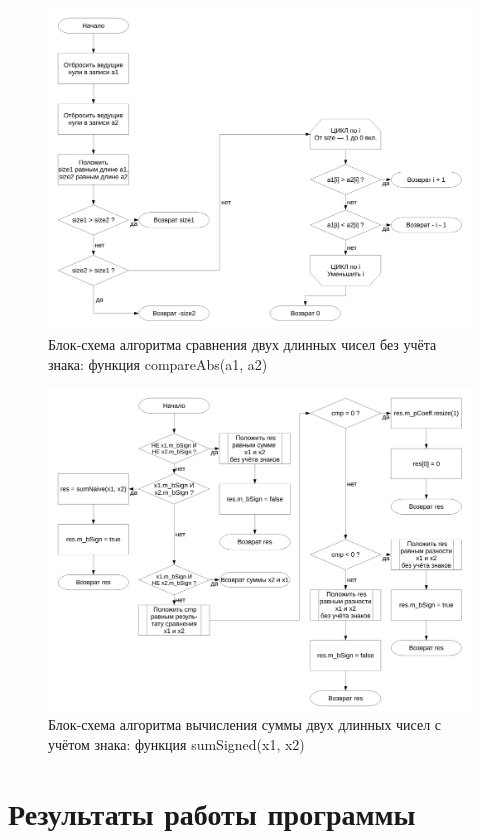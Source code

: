 \documentclass[a4paper,12pt]{article} %
\begin{document}
\begin{figure}[ht]
	\includegraphics[width=\textwidth]{lr1_compareAbs.pdf}
	\caption{Блок-схема алгоритма сравнения двух длинных чисел без учёта знака: функция compareAbs(a1, a2)}
\end{figure}

\begin{figure}[ht]
	\includegraphics[width=\textwidth]{lr1_sumSigned.pdf}
	\caption{Блок-схема алгоритма вычисления суммы двух длинных чисел с учётом знака: функция sumSigned(x1, x2)}
\end{figure}


\clearpage

\section*{Результаты работы программы}
\end{document}
